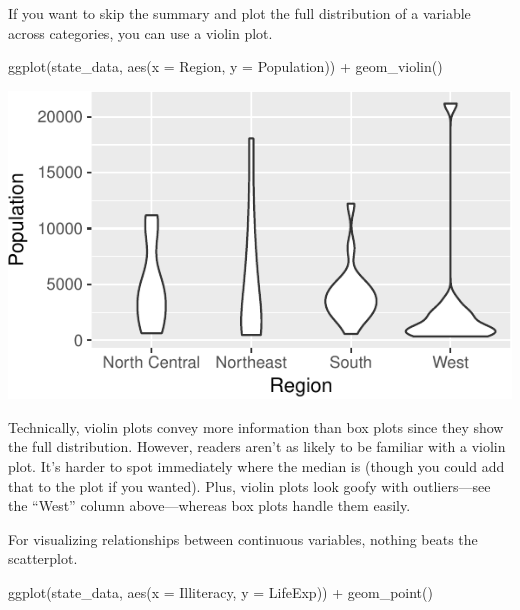 \documentclass[
  12pt,
  oneside,openany]{book}
\newenvironment{Shaded}{\begin{snugshade}}{\end{snugshade}}
\newcommand{\AttributeTok}[1]{\textcolor[rgb]{0.77,0.63,0.00}{#1}}
\newcommand{\FunctionTok}[1]{\textcolor[rgb]{0.00,0.00,0.00}{#1}}
\newcommand{\NormalTok}[1]{#1}
\newcommand{\SpecialCharTok}[1]{\textcolor[rgb]{0.00,0.00,0.00}{#1}}
\begin{document}
If you want to skip the summary and plot the full distribution of a variable across categories, you can use a violin plot.

\begin{Shaded}
\begin{Highlighting}[]
\FunctionTok{ggplot}\NormalTok{(state\_data, }\FunctionTok{aes}\NormalTok{(}\AttributeTok{x =}\NormalTok{ Region, }\AttributeTok{y =}\NormalTok{ Population)) }\SpecialCharTok{+}
  \FunctionTok{geom\_violin}\NormalTok{()}
\end{Highlighting}
\end{Shaded}

\includegraphics{pdaps_files/figure-latex/violin-1.pdf}

Technically, violin plots convey more information than box plots since they show the full distribution. However, readers aren't as likely to be familiar with a violin plot. It's harder to spot immediately where the median is (though you could add that to the plot if you wanted). Plus, violin plots look goofy with outliers---see the ``West'' column above---whereas box plots handle them easily.

For visualizing relationships between continuous variables, nothing beats the scatterplot.

\begin{Shaded}
\begin{Highlighting}[]
\FunctionTok{ggplot}\NormalTok{(state\_data, }\FunctionTok{aes}\NormalTok{(}\AttributeTok{x =}\NormalTok{ Illiteracy, }\AttributeTok{y =}\NormalTok{ LifeExp)) }\SpecialCharTok{+}
  \FunctionTok{geom\_point}\NormalTok{()}
\end{Highlighting}
\end{Shaded}
\end{document}
